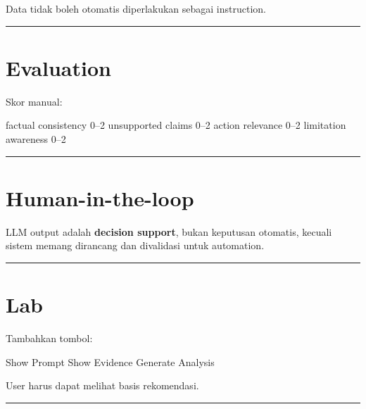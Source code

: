 \documentclass[
  indonesian,
  letterpaper,
  DIV=11,
  numbers=noendperiod]{scrreprt}
\newenvironment{Shaded}{\begin{snugshade}}{\end{snugshade}}
\newcommand{\NormalTok}[1]{\textcolor[rgb]{0.00,0.23,0.31}{#1}}
\begin{document}
Data tidak boleh otomatis diperlakukan sebagai instruction.

\begin{center}\rule{0.5\linewidth}{0.5pt}\end{center}

\section{Evaluation}\label{evaluation}

Skor manual:

\begin{Shaded}
\begin{Highlighting}[]
\NormalTok{factual consistency 0–2}
\NormalTok{unsupported claims 0–2}
\NormalTok{action relevance 0–2}
\NormalTok{limitation awareness 0–2}
\end{Highlighting}
\end{Shaded}

\begin{center}\rule{0.5\linewidth}{0.5pt}\end{center}

\section{Human-in-the-loop}\label{human-in-the-loop}

LLM output adalah \textbf{decision support}, bukan keputusan otomatis,
kecuali sistem memang dirancang dan divalidasi untuk automation.

\begin{center}\rule{0.5\linewidth}{0.5pt}\end{center}

\section{Lab}\label{lab-8}

Tambahkan tombol:

\begin{Shaded}
\begin{Highlighting}[]
\NormalTok{Show Prompt}
\NormalTok{Show Evidence}
\NormalTok{Generate Analysis}
\end{Highlighting}
\end{Shaded}

User harus dapat melihat basis rekomendasi.

\begin{center}\rule{0.5\linewidth}{0.5pt}\end{center}
\end{document}
